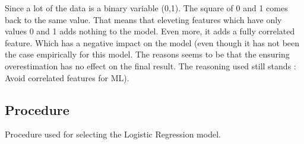 \documentclass{article}
\begin{document}
Since a lot of the data is a binary variable (0,1). The square of 0 and 1 comes back to the same value. That means that eleveting features which have only values 0 and 1 adds nothing to the model. Even more, it adds a fully correlated feature. Which has a negative impact on the model (even though it has not been the case empirically for this model. The reasons seems to be that the ensuring overestimation has no effect on the final result. The reasoning used still stands : Avoid correlated features for ML).
\\
\subsection{Procedure}

Procedure used for selecting the Logistic Regression model.
\end{document}
